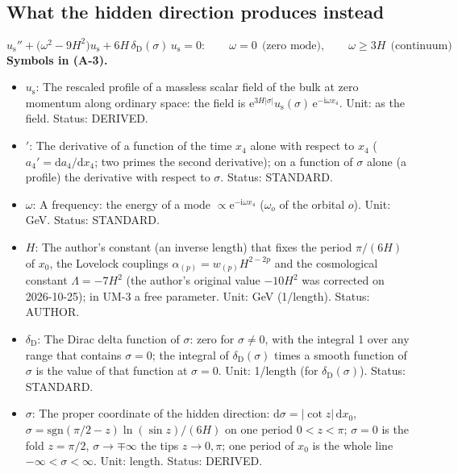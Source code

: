\documentclass[
  10pt,
]{article}
\providecommand{\tightlist}{%
  \setlength{\itemsep}{0pt}\setlength{\parskip}{0pt}}
\begin{document}
\hypertarget{what-the-hidden-direction-produces-instead}{%
\subsection{What the hidden direction produces
instead}\label{what-the-hidden-direction-produces-instead}}

\[
u_{\mathrm{s}}'' + \big(\omega^2 - 9H^2\big)u_{\mathrm{s}} + 6H\,\delta_{\mathrm{D}}(\sigma)\,u_{\mathrm{s}} = 0:\qquad
\omega = 0\ \ \text{(zero mode)},\qquad \omega \ge 3H\ \ \text{(continuum)} \tag{A-3}
\] \textbf{Symbols in (A-3).}

\begin{itemize}
\tightlist
\item
  \(u_{\mathrm{s}}\): The rescaled profile of a massless scalar field of
  the bulk at zero momentum along ordinary space: the field is
  \(\mathrm{e}^{3H\lvert\sigma\rvert}u_{\mathrm{s}}(\sigma)\,\mathrm{e}^{-\mathrm{i}\omega x_4}\).
  Unit: as the field. Status: DERIVED.
\item
  \({}'\): The derivative of a function of the time \(x_4\) alone with
  respect to \(x_4\) (\(a_4' = \mathrm{d}a_4/\mathrm{d}x_4\); two primes
  the second derivative); on a function of \(\sigma\) alone (a profile)
  the derivative with respect to \(\sigma\). Status: STANDARD.
\item
  \(\omega\): A frequency: the energy of a mode
  \(\propto \mathrm{e}^{-\mathrm{i}\omega x_4}\) (\(\omega_o\) of the
  orbital \(o\)). Unit: GeV. Status: STANDARD.
\item
  \(H\): The author's constant (an inverse length) that fixes the period
  \(\pi/(6H)\) of \(x_0\), the Lovelock couplings
  \(\alpha_{(p)} = w_{(p)}H^{2-2p}\) and the cosmological constant
  \(\Lambda = -7H^2\) (the author's original value \(-10H^2\) was
  corrected on 2026-10-25); in UM-3 a free parameter. Unit: GeV
  (1/length). Status: AUTHOR.
\item
  \(\delta_{\mathrm{D}}\): The Dirac delta function of \(\sigma\): zero
  for \(\sigma \ne 0\), with the integral 1 over any range that contains
  \(\sigma = 0\); the integral of \(\delta_{\mathrm{D}}(\sigma)\) times
  a smooth function of \(\sigma\) is the value of that function at
  \(\sigma = 0\). Unit: 1/length (for \(\delta_{\mathrm{D}}(\sigma)\)).
  Status: STANDARD.
\item
  \(\sigma\): The proper coordinate of the hidden direction:
  \(\mathrm{d}\sigma = \lvert\cot z\rvert\,\mathrm{d}x_0\),
  \(\sigma = \mathrm{sgn}(\pi/2 - z)\ln(\sin z)/(6H)\) on one period
  \(0 < z < \pi\); \(\sigma = 0\) is the fold \(z = \pi/2\),
  \(\sigma \to \mp\infty\) the tips \(z \to 0, \pi\); one period of
  \(x_0\) is the whole line \(-\infty < \sigma < \infty\). Unit: length.
  Status: DERIVED.
\end{itemize}
\end{document}
